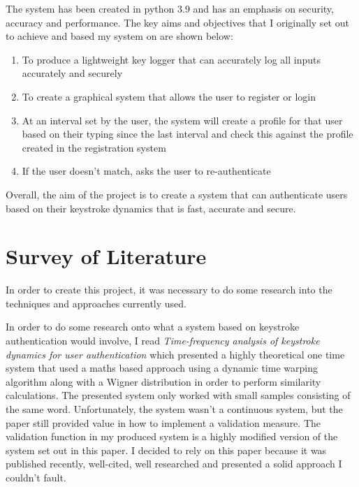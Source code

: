 \documentclass[10pt,a4paper]{report}
\begin{document}
The system has been created in python 3.9 and has an emphasis on security, accuracy and performance. The key aims and objectives that I originally set out to achieve and based my system on are shown below:

\begin{enumerate}
	\item To produce a lightweight key logger that can accurately log all inputs accurately and securely
	\item To create a graphical system that allows the user to register or login
	\item At an interval set by the user, the system will create a profile for that user based on their typing since the last interval and check this against the profile created in the registration system
	\item If the user doesn't match, asks the user to re-authenticate
\end{enumerate}

Overall, the aim of the project is to create a system that can authenticate users based on their keystroke dynamics that is fast, accurate and secure.

\chapter{Survey of Literature}

In order to create this project, it was necessary to do some research into the techniques and approaches currently used.

In order to do some research onto what a system based on keystroke authentication would involve, I read \emph{Time-frequency analysis of keystroke dynamics for user authentication}\cite{ToosiRamin2021Taok} which presented a highly theoretical one time system that used a maths based approach using a dynamic time warping algorithm along with a Wigner distribution in order to perform similarity calculations. The presented system only worked with small samples consisting of the same word. Unfortunately, the system wasn't a continuous system, but the paper still provided value in how to implement a validation measure. The validation function in my produced system is a highly modified version of the system set out in this paper. I decided to rely on this paper because it was published recently, well-cited, well researched and presented a solid approach I couldn't fault.
\end{document}

